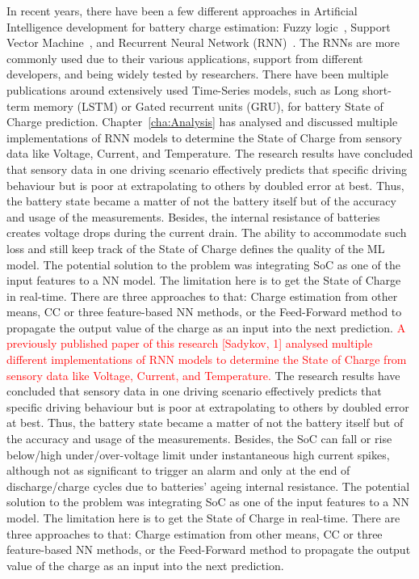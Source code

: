 %
In recent years, there have been a few different approaches in Artificial Intelligence development for battery charge estimation: Fuzzy logic~\cite{malkhandi_fuzzy_2006}, Support Vector Machine~\cite{hansen_support_2005, anton_battery_2013}, and Recurrent Neural Network (RNN)~\cite{song_lithium-ion_2018,Chemali2017,mamo_long_2020,jiao_gru-rnn_2020,xiao_accurate_2019,javid_adaptive_2020,zhang_deep_2020}.
The RNNs are more commonly used due to their various applications, support from different developers, and being widely tested by researchers.
There have been multiple publications around extensively used Time-Series models, such as Long short-term memory (LSTM) or Gated recurrent units (GRU), for battery State of Charge prediction.
{
Chapter~\ref{cha:Analysis} has analysed and discussed multiple implementations of RNN models to determine the State of Charge from sensory data like Voltage, Current, and Temperature.
The research results have concluded that sensory data in one driving scenario effectively predicts that specific driving behaviour but is poor at extrapolating to others by doubled error at best.
Thus, the battery state became a matter of not the battery itself but of the accuracy and usage of the measurements.
Besides, the internal resistance of batteries creates voltage drops during the current drain.
The ability to accommodate such loss and still keep track of the State of Charge defines the quality of the ML model.
The potential solution to the problem was integrating SoC as one of the input features to a NN model.
The limitation here is to get the State of Charge in real-time.
There are three approaches to that: Charge estimation from other means, CC or three feature-based NN methods, or the Feed-Forward method to propagate the output value of the charge as an input into the next prediction.
} {
\textcolor{red}{A previously published paper of this research [Sadykov, 1] analysed multiple different implementations of RNN models to determine the State of Charge from sensory data like Voltage, Current, and Temperature.}
The research results have concluded that sensory data in one driving scenario effectively predicts that specific driving behaviour but is poor at extrapolating to others by doubled error at best.
Thus, the battery state became a matter of not the battery itself but of the accuracy and usage of the measurements.
Besides, the SoC can fall or rise below/high under/over-voltage limit under instantaneous high current spikes, although not as significant to trigger an alarm and only at the end of discharge/charge cycles due to batteries' ageing internal resistance.
The potential solution to the problem was integrating SoC as one of the input features to a NN model.
The limitation here is to get the State of Charge in real-time.
There are three approaches to that: Charge estimation from other means, CC or three feature-based NN methods, or the Feed-Forward method to propagate the output value of the charge as an input into the next prediction.
}


